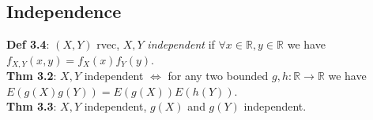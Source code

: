 \subsection{Independence}
\textbf{Def 3.4}: $(X,Y)$ rvec, $X,Y$ \textit{independent} if $\forall x\in \mathbb{R}, y\in\mathbb{R}$ we have $f_{X,Y}(x,y) = f_X(x)f_Y(y)$.\\
\textbf{Thm 3.2}: $X,Y$ independent $\Leftrightarrow$ for any two bounded $g,h:\mathbb{R}\to\mathbb{R}$ we have $E(g(X)g(Y)) = E(g(X))E(h(Y))$.\\
\textbf{Thm 3.3}: $X,Y$ independent, $g(X)$ and $g(Y)$ independent.\\

 


